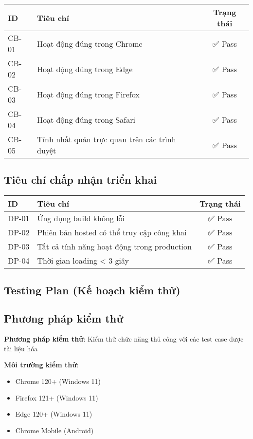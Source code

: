 \begin{longtable}{|l|p{8cm}|c|}
\hline
\textbf{ID} & \textbf{Tiêu chí} & \textbf{Trạng thái} \\
\hline
\endhead
CB-01 & Hoạt động đúng trong Chrome & ✅ Pass \\
CB-02 & Hoạt động đúng trong Edge & ✅ Pass \\
CB-03 & Hoạt động đúng trong Firefox & ✅ Pass \\
CB-04 & Hoạt động đúng trong Safari & ✅ Pass \\
CB-05 & Tính nhất quán trực quan trên các trình duyệt & ✅ Pass \\
\hline
\end{longtable}

\subsection{Tiêu chí chấp nhận triển khai}

\begin{longtable}{|l|p{8cm}|c|}
\hline
\textbf{ID} & \textbf{Tiêu chí} & \textbf{Trạng thái} \\
\hline
\endhead
DP-01 & Ứng dụng build không lỗi & ✅ Pass \\
DP-02 & Phiên bản hosted có thể truy cập công khai & ✅ Pass \\
DP-03 & Tất cả tính năng hoạt động trong production & ✅ Pass \\
DP-04 & Thời gian loading < 3 giây & ✅ Pass \\
\hline
\end{longtable}

\subsection{Testing Plan (Kế hoạch kiểm thử)}

\subsection{Phương pháp kiểm thử}

\textbf{Phương pháp kiểm thử}: Kiểm thử chức năng thủ công với các test case được tài liệu hóa

\textbf{Môi trường kiểm thử}:
\begin{itemize}
    \item Chrome 120+ (Windows 11)
    \item Firefox 121+ (Windows 11)
    \item Edge 120+ (Windows 11)
    \item Chrome Mobile (Android)
\end{itemize}

